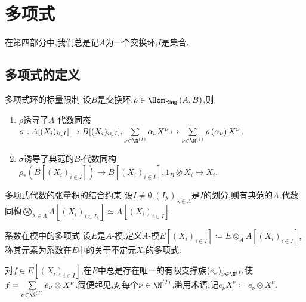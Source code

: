 \chapter{多项式}

在第四部分中,我们总是记$A$为一个交换环,$I$是集合.

\section{多项式的定义}

\begin{proposition}{多项式环的标量限制}{}
	设$B$是交换环,$\rho\in\Hom_{\mathsf{Ring}}\left(A,B\right)$,则
	\begin{enumerate}
		\item $\rho$诱导了$A$-代数同态$\sigma:A[(X_{i})_{i\in I}]\to B[(X_{i})_{i\in I}],\sum\limits_{\nu\in\N^{\left(I\right)}}\alpha_{\nu}X^{\nu}\mapsto\sum\limits_{\nu\in\N^{\left(I\right)}}\rho\left(\alpha_{\nu}\right)X^{\nu}$.
		\item $\sigma$诱导了典范的$B$-代数同构$\rho_{\ast}\left(B[(X_{i})_{i\in I}]\right)\to B[(X_{i})_{i\in I}],1_{B}\otimes X_{i}\mapsto X_{i}$.
	\end{enumerate}
\end{proposition}

\begin{proposition}{多项式代数的张量积的结合约束}{}
	设$I\neq\emptyset$,$\left(I_{\lambda}\right)_{\lambda\in\Lambda}$是$I$的划分,则有典范的$A$-代数同构$\bigotimes\limits_{\lambda\in\Lambda}A[(X_{i})_{i\in I_{\lambda}}]\simeq A[(X_{i})_{i\in I}]$.
\end{proposition}

\begin{definition}{系数在模中的多项式}{}
	设$E$是$A$-模.定义$A$-模$E[(X_{i})_{i\in I}]\coloneq E\otimes_{A}A[(X_{i})_{i\in I}]$,称其元素为系数在$E$中的关于不定元$X_{i}$的多项式.
\end{definition}

\begin{remark}{}{}
	对$f\in E[(X_{i})_{i\in I}]$,在$E$中总是存在唯一的有限支撑族$\left(e_{\nu}\right)_{\nu\in\N^{\left(I\right)}}$使$f=\sum\limits_{\nu\in\N^{\left(I\right)}}e_{\nu}\otimes X^{\nu}$.简便起见,对每个$\nu\in\N^{\left(I\right)}$,滥用术语,记$e_{\nu}X^{\nu}\coloneq e_{\nu}\otimes X^{\nu}$.
\end{remark}